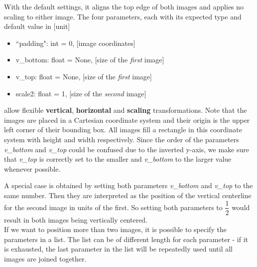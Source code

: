 \documentclass[a4paper, 12pt, bibliography=totoc]{scrartcl}
\begin{document}


With the default settings, it aligns the top edge of both images and applies no scaling to either image.
The four parameters, each with its expected type and default value in [unit]
\begin{itemize}[label=$\ast$, left=40pt]
	\item ``padding": int = 0, [image coordinates]
	\item v\_bottom: float = None, [size of the \textit{first} image]
	\item v\_top: float = None, [size of the \textit{first} image]
	\item scale2: float = 1, [size of the \textit{second} image]
\end{itemize}
allow flexible \textbf{vertical}, \textbf{horizontal} and \textbf{scaling} transformations.
Note that the images are placed in a Cartesian coordinate system and their origin is the upper left corner of their bounding box. All images fill a rectangle in this coordinate system with height and width respectively.
Since the order of the parameters \textit{v\_bottom} and \textit{v\_top} could be confused due to the inverted y-axis, we make sure that \textit{v\_top} is correctly set to the smaller and \textit{v\_bottom} to the larger value whenever possible.

A special case is obtained by setting both parameters \textit{v\_bottom} and \textit{v\_top} to the same number. Then they are interpreted as the position of the vertical centerline for the second image in units of the first. So setting both parameters to $\dfrac{1}{2}$ would result in both images being vertically centered.\\

If we want to position more than two images, it is possible to specify the parameters in a list.
The list can be of different length for each parameter - if it is exhausted, the last parameter in the list will be repeatedly used until all images are joined together.

\newpage
\end{document}

